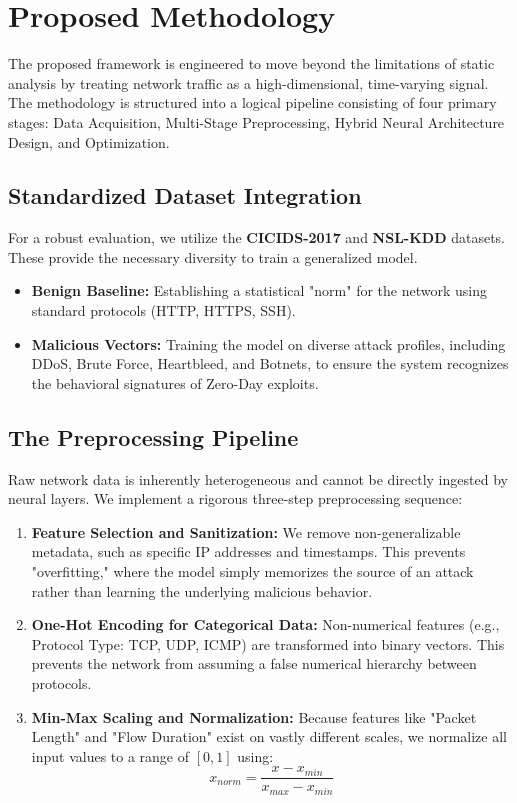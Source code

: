 \documentclass[10pt, conference, compsocconf, letterpaper, twocolumn, twoside]{IEEEtran}
\begin{document}
\section{Proposed Methodology}
The proposed framework is engineered to move beyond the limitations of static analysis by treating network traffic as a high-dimensional, time-varying signal. The methodology is structured into a logical pipeline consisting of four primary stages: Data Acquisition, Multi-Stage Preprocessing, Hybrid Neural Architecture Design, and Optimization.

\subsection{Standardized Dataset Integration}
For a robust evaluation, we utilize the \textbf{CICIDS-2017} and \textbf{NSL-KDD} datasets. These provide the necessary diversity to train a generalized model.
\begin{itemize}
    \item \textbf{Benign Baseline:} Establishing a statistical "norm" for the network using standard protocols (HTTP, HTTPS, SSH).
    \item \textbf{Malicious Vectors:} Training the model on diverse attack profiles, including DDoS, Brute Force, Heartbleed, and Botnets, to ensure the system recognizes the behavioral signatures of Zero-Day exploits.
\end{itemize}

\subsection{The Preprocessing Pipeline}
Raw network data is inherently heterogeneous and cannot be directly ingested by neural layers. We implement a rigorous three-step preprocessing sequence:
\begin{enumerate}
    \item \textbf{Feature Selection and Sanitization:} We remove non-generalizable metadata, such as specific IP addresses and timestamps. This prevents "overfitting," where the model simply memorizes the source of an attack rather than learning the underlying malicious behavior.
    \item \textbf{One-Hot Encoding for Categorical Data:} Non-numerical features (e.g., Protocol Type: TCP, UDP, ICMP) are transformed into binary vectors. This prevents the network from assuming a false numerical hierarchy between protocols.
    \item \textbf{Min-Max Scaling and Normalization:} Because features like "Packet Length" and "Flow Duration" exist on vastly different scales, we normalize all input values to a range of $[0, 1]$ using:
    \begin{equation}
    x_{norm} = \frac{x - x_{min}}{x_{max} - x_{min}}
    \end{equation}
\end{enumerate}
\end{document}

